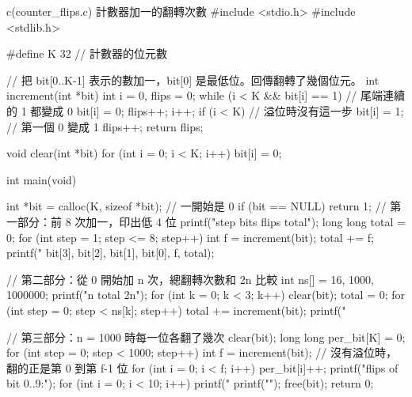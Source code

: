 \begin{example}[label=ex:counter-flips]{c}{(counter\_flips.c) 計數器加一的翻轉次數}
#include <stdio.h>
#include <stdlib.h>

#define K 32                    // 計數器的位元數

// 把 bit[0..K-1] 表示的數加一，bit[0] 是最低位。回傳翻轉了幾個位元。
int increment(int *bit)
{
    int i = 0, flips = 0;
    while (i < K && bit[i] == 1) {     // 尾端連續的 1 都變成 0
        bit[i] = 0;
        flips++;
        i++;
    }
    if (i < K) {                       // 溢位時沒有這一步
        bit[i] = 1;                    // 第一個 0 變成 1
        flips++;
    }
    return flips;
}

void clear(int *bit)
{
    for (int i = 0; i < K; i++) {
        bit[i] = 0;
    }
}

int main(void)
{
    int *bit = calloc(K, sizeof *bit);   // 一開始是 0
    if (bit == NULL) {
        return 1;
    }
    // 第一部分：前 8 次加一，印出低 4 位
    printf("step bits flips total\n");
    long long total = 0;
    for (int step = 1; step <= 8; step++) {
        int f = increment(bit);
        total += f;
        printf("%
               bit[3], bit[2], bit[1], bit[0], f, total);
    }

    // 第二部分：從 0 開始加 n 次，總翻轉次數和 2n 比較
    int ns[] = {16, 1000, 1000000};
    printf("n total 2n\n");
    for (int k = 0; k < 3; k++) {
        clear(bit);
        total = 0;
        for (int step = 0; step < ns[k]; step++) {
            total += increment(bit);
        }
        printf("%
    }

    // 第三部分：n = 1000 時每一位各翻了幾次
    clear(bit);
    long long per_bit[K] = {0};
    for (int step = 0; step < 1000; step++) {
        int f = increment(bit);
        // 沒有溢位時，翻的正是第 0 到第 f-1 位
        for (int i = 0; i < f; i++) {
            per_bit[i]++;
        }
    }
    printf("flips of bit 0..9:");
    for (int i = 0; i < 10; i++) {
        printf(" %
    }
    printf("\n");
    free(bit);
    return 0;
}
\end{example}

